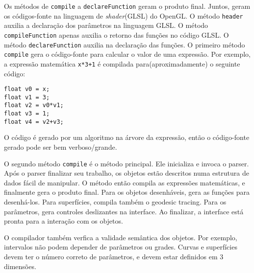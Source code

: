 Os métodos de \texttt{compile} a \texttt{declareFunction} geram o produto final.
Juntos, geram os códigos-fonte na linguagem de \textit{shader}(GLSL) do OpenGL.
O método \texttt{header} auxilia a declaração dos parâmetros na linguagem GLSL.
O método \texttt{compileFunction} apenas auxilia o retorno das funções no código GLSL.
O método \texttt{declareFunction} auxilia na declaração das funções.
O primeiro método \texttt{compile} gera o código-fonte para calcular o valor de uma
expressão.
Por exemplo, a expressão matemática \texttt{x*3+1} é
compilada para(aproximadamente) o seguinte código:

\begin{lstlisting}
float v0 = x;
float v1 = 3;
float v2 = v0*v1;
float v3 = 1;
float v4 = v2+v3;
\end{lstlisting}

O código é gerado por um algoritmo na árvore da expressão,
então o código-fonte gerado pode ser bem verboso/grande.

O segundo método \texttt{compile} é o método principal.
Ele inicializa e invoca o parser.
Após o parser finalizar seu trabalho, os objetos estão descritos
numa estrutura de dados fácil de manipular.
O método então compila as expressões matemáticas, e finalmente gera o produto final.
Para os objetos desenháveis, gera as funções para desenhá-los.
Para superfícies, compila também o geodesic tracing.
Para os parâmetros, gera controles deslizantes na interface.
Ao finalizar, a interface está pronta para a interação com os objetos.

O compilador também verfica a validade semântica dos objetos.
Por exemplo, intervalos não podem depender de parâmetros ou grades.
Curvas e superfícies devem ter o número correto de parâmetros, e devem estar
definidos em 3 dimensões.